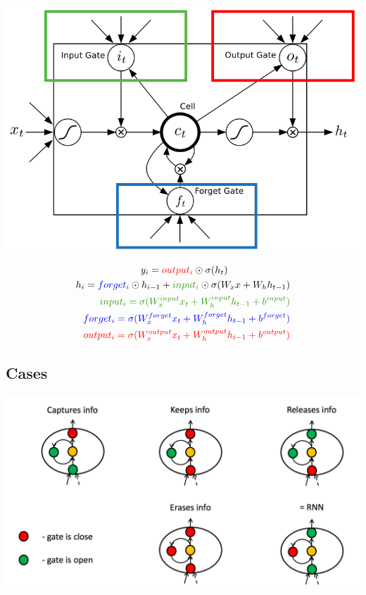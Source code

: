 \documentclass{beamer}
\begin{document}
	\begin{frame}
			\begin{center}
				\includegraphics[scale=0.25]{img/lstm2}
			\end{center}
	
			\vspace{-0.6cm}
			\begin{align*}
				y_i = \textcolor{red}{output_i} \odot \sigma(h_t)~~~~~~~~~~~~~~~~~~~\\ 
				h_i = \textcolor{blue}{forget_i} \odot h_{i-1} +  \textcolor{green}{input_i} 
				\odot \sigma(W_x x + W_h h_{t-1})\\
				\textcolor{green}{input_i = \sigma(W^{input}_x x_t + W^{input}_h h_{t-1}+ b^{input}) } \\
				\textcolor{blue}{forget_i =  \sigma(W^{forget}_x x_t + W^{forget}_h h_{t-1}+ b^{forget}) }  \\
				\textcolor{red}{output_i = \sigma(W^{output}_x x_t + W^{output}_h h_{t-1}+ b^{output})} \\
			\end{align*}		
			
	\end{frame}
	
	\subsection*{Cases}
	\begin{frame}
		
		\begin{center}
			\includegraphics[scale=0.25]{img/cases}
		\end{center}					
	\end{frame}
		
\end{document}
